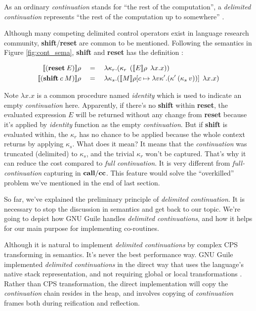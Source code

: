 \documentclass[numbers,numberedpars]{sigplanconf}
\begin{document}
As an ordinary {\it continuation} stands for ``the rest of the computation'', a {\it delimited continuation} represents
``the rest of the computation up to somewhere'' \citep{sumii2000implementation}.

Although many competing delimited control operators exist in language research community, {\bf shift}/{\bf reset} are common to be mentioned. 
Following the semantics in Figure \ref{fig:cont_sema}, {\bf shift} and {\bf reset} has the definition \citep{Danvy92representingcontrol:}:

\begin{align*}
  \llbracket{(\text{{\bf reset}}\:E)}\rrbracket\rho \quad&=\quad \lambda{\kappa_r}.(\kappa_r\:\: (\llbracket{E}\rrbracket\rho\:\: \lambda{x}.x))
  \\
  \llbracket{(\text{{\bf shift}}\:c\:M)}\rrbracket\rho \quad&=\quad
  \lambda{\kappa_s}.(\llbracket{M}\rrbracket\rho[c\mapsto\lambda{v\kappa'}.(\kappa'\:(\kappa_s\:v))]\:\:\lambda{x}.x)
\end{align*}

Note $\lambda{x}.x$ is a common procedure named {\it identity} which is used to indicate an empty {\it continuation} here.
Apparently, if there's no {\bf shift} within {\bf reset}, the evaluated expression $E$ will be returned without any change from {\bf reset} because
it's applied by {\it identity} function as the empty {\it continuation}. But if {\bf shift} is evaluated within, the $\kappa_r$ has no chance to
be applied because the whole context returns by applying $\kappa_s$. What does it mean? It means that the {\it continuation} was truncated (delimited) to
$\kappa_s$, and the trivial $\kappa_r$ won't be captured. That's why it can reduce the cost compared to {\it full continuation}.
It is very different from {\it full-continuation}
capturing in ${\bf call/cc}$. This feature would solve the ``overkilled'' problem we've mentioned in the end of last section.

So far, we've explained the preliminary principle of {\it delimited continuation}. It is necessary to stop the discussion in semantics and get back
to our topic. We're going to depict how GNU Guile handles {\it delimited continuations}, and how it helps for our main purpose for implementing
co-routines.

Although it is natural to implement {\it delimited continuations} by complex CPS transforming in semantics. It's never the best performance way.
GNU Guile implemented {\it delimited continuations} in the direct way that uses the language's native stack representation, and not requiring global
or local transformations \citep{wingo2010}. Rather than CPS transformation, the direct implementation will copy the {\it continuation} chain resides in the
heap, and involves copying of {\it continuation} frames both during reification and reflection.
\end{document}
